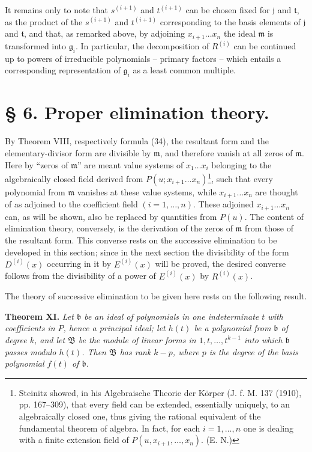 \documentclass[11pt]{article}
\providecommand{\Bmod}{\mathfrak B}
\providecommand{\mideal}{\mathfrak m}
\providecommand{\gideal}{\mathfrak g}
\providecommand{\jideal}{\mathfrak j}
\providecommand{\tideal}{\mathfrak t}
\providecommand{\bideal}{\mathfrak b}
\begin{document}
It remains only to note that $s^{(i+1)}$ and $t^{(i+1)}$ can be chosen fixed for $\jideal$ and $\tideal$, as the product of the $s^{(i+1)}$ and $t^{(i+1)}$ corresponding to the basis elements of $\jideal$ and $\tideal$, and that, as remarked above, by adjoining $x_{i+1}\ldots x_n$ the ideal $\mideal$ is transformed into $\gideal_i$. In particular, the decomposition of $R^{(i)}$ can be continued up to powers of irreducible polynomials -- primary factors -- which entails a corresponding representation of $\gideal_i$ as a least common multiple.

\section*{§ 6. Proper elimination theory.}

By Theorem VIII, respectively formula (34), the resultant form and the elementary-divisor form are divisible by $\mideal$, and therefore vanish at all zeros of $\mideal$. Here by ``zeros of $\mideal$'' are meant value systems of $x_1\ldots x_i$ belonging to the algebraically closed field derived from $P(u;x_{i+1}\ldots x_n)$\footnote{Steinitz showed, in his Algebraische Theorie der Körper (J. f. M. 137 (1910), pp. 167--309), that every field can be extended, essentially uniquely, to an algebraically closed one, thus giving the rational equivalent of the fundamental theorem of algebra. In fact, for each $i=1,\ldots,n$ one is dealing with a finite extension field of $P(u,x_{i+1},\ldots,x_n)$. (E. N.)}, such that every polynomial from $\mideal$ vanishes at these value systems, while $x_{i+1}\ldots x_n$ are thought of as adjoined to the coefficient field $(i=1,
\ldots,n)$. These adjoined $x_{i+1}\ldots x_n$ can, as will be shown, also be replaced by quantities from $P(u)$. The content of elimination theory, conversely, is the derivation of the zeros of $\mideal$ from those of the resultant form. This converse rests on the successive elimination to be developed in this section; since in the next section the divisibility of the form $D^{(i)}(x)$ occurring in it by $E^{(i)}(x)$ will be proved, the desired converse follows from the divisibility of a power of $E^{(i)}(x)$ by $R^{(i)}(x)$.

The theory of successive elimination to be given here rests on the following result.

\medskip
\noindent\textbf{Theorem XI.} \emph{Let $\bideal$ be an ideal of polynomials in one indeterminate $t$ with coefficients in $P$, hence a principal ideal; let $h(t)$ be a polynomial from $\bideal$ of degree $k$, and let $\Bmod$ be the module of linear forms in $1,t,\ldots,t^{k-1}$ into which $\bideal$ passes modulo $h(t)$. Then $\Bmod$ has rank $k-p$, where $p$ is the degree of the basis polynomial $f(t)$ of $\bideal$.}
\end{document}
